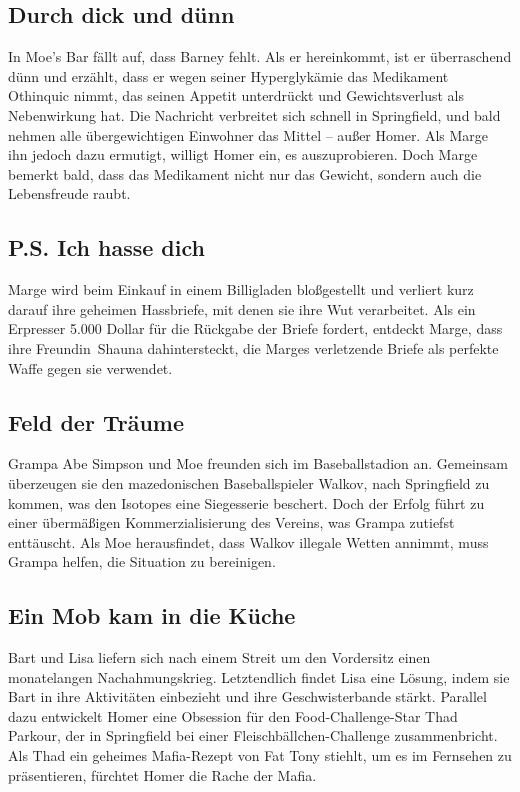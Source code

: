 \subsection{Durch dick und dünn}
In Moe's Bar fällt auf, dass Barney fehlt. Als er hereinkommt, ist er überraschend dünn und erzählt, dass er wegen seiner Hyperglykämie das Medikament Othinquic nimmt, das seinen Appetit unterdrückt und Gewichtsverlust als Nebenwirkung hat. Die Nachricht verbreitet sich schnell in Springfield, und bald nehmen alle übergewichtigen Einwohner das Mittel -- außer Homer. Als Marge ihn jedoch dazu ermutigt, willigt Homer ein, es auszuprobieren. Doch Marge bemerkt bald, dass das Medikament nicht nur das Gewicht, sondern auch die Lebensfreude raubt.

\subsection{P.S. Ich hasse dich}
Marge wird beim Einkauf in einem Billigladen bloßgestellt und verliert kurz darauf ihre geheimen Hassbriefe, mit denen sie ihre Wut verarbeitet. Als ein Erpresser 5.000 Dollar für die Rückgabe der Briefe fordert, entdeckt Marge, dass ihre \glqq Freundin\grqq\ Shauna dahintersteckt, die Marges verletzende Briefe als perfekte Waffe gegen sie verwendet.

\subsection{Feld der Träume}
Grampa Abe Simpson und Moe freunden sich im Baseballstadion an. Gemeinsam überzeugen sie den mazedonischen Baseballspieler Walkov, nach Springfield zu kommen, was den Isotopes eine Siegesserie beschert. Doch der Erfolg führt zu einer übermäßigen Kommerzialisierung des Vereins, was Grampa zutiefst enttäuscht. Als Moe herausfindet, dass Walkov illegale Wetten annimmt, muss Grampa helfen, die Situation zu bereinigen.

\subsection{Ein Mob kam in die Küche}
Bart und Lisa liefern sich nach einem Streit um den Vordersitz einen monatelangen Nachahmungskrieg. Letztendlich findet Lisa eine Lösung, indem sie Bart in ihre Aktivitäten einbezieht und ihre Geschwisterbande stärkt.
Parallel dazu entwickelt Homer eine Obsession für den Food-Challenge-Star Thad Parkour, der in Springfield bei einer Fleischbällchen-Challenge zusammenbricht. Als Thad ein geheimes Mafia-Rezept von Fat Tony stiehlt, um es im Fernsehen zu präsentieren, fürchtet Homer die Rache der Mafia.

